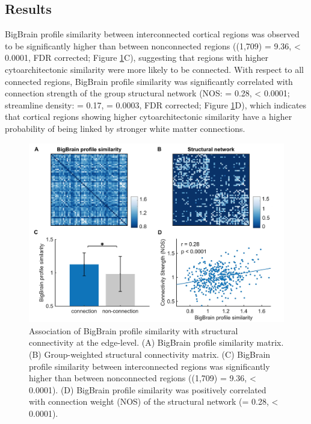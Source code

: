 \begin{refsection}
\section*{Results}
BigBrain profile similarity between interconnected cortical regions was observed to be significantly higher than between nonconnected regions (\tvaldf(1,709) = 9.36, \pval < 0.0001, FDR corrected; Figure \ref{bigbrainFig2}C), suggesting that regions with higher cytoarchitectonic similarity were more likely to be connected. With respect to all connected regions, BigBrain profile similarity was significantly correlated with connection strength of the group structural network (NOS: \rval = 0.28, 
\pval < 0.0001; streamline density: \rval = 0.17, \pval = 0.0003, FDR corrected; Figure \ref{bigbrainFig2}D), which indicates that cortical regions showing higher cytoarchitectonic similarity have a higher probability of being linked by stronger white matter connections.

\begin{figure}[h]
    \centering
    \includegraphics[width=12cm]{images/thesis_bb_fig2.jpg}
    \caption{Association of BigBrain profile similarity with structural connectivity at the edge-level. (A) BigBrain profile similarity matrix. (B) Group-weighted structural connectivity matrix. (C) BigBrain profile similarity between interconnected regions was significantly higher than between nonconnected regions (\tvaldf(1,709) = 9.36, \pval < 0.0001). (D) BigBrain profile similarity was positively correlated with connection weight (NOS) of the structural network (\rval = 0.28, \pval < 0.0001).}
    \label{bigbrainFig2}
\end{figure}


\end{refsection}
